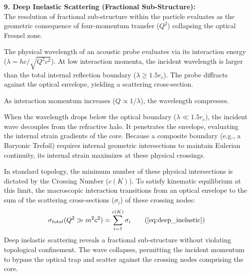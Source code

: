 \textbf{9. Deep Inelastic Scattering (Fractional Sub-Structure):} \\
The resolution of fractional sub-structure within the particle evaluates as the geometric consequence of four-momentum transfer ($Q^2$) collapsing the optical Fresnel zone.

The physical wavelength of an acoustic probe evaluates via its interaction energy ($\lambda = hc / \sqrt{Q^2 c^2}$). At low interaction momenta, the incident wavelength is larger than the total internal reflection boundary ($\lambda \ge 1.5 r_c$). The probe diffracts against the optical envelope, yielding a scattering cross-section.

As interaction momentum increases ($Q \propto 1/\lambda$), the wavelength compresses.  

When the wavelength drops below the optical boundary ($\lambda \ll 1.5 r_c$), the incident wave decouples from the refractive halo. It penetrates the envelope, evaluating the internal strain gradients of the core. Because a composite boundary (e.g., a Baryonic Trefoil) requires internal geometric intersections to maintain Eulerian continuity, its internal strain maximizes at these physical crossings.

In standard topology, the minimum number of these physical intersections is dictated by the Crossing Number ($c(K)$). To satisfy kinematic equilibrium at this limit, the macroscopic interaction transitions from an optical envelope to the sum of the scattering cross-sections ($\sigma_i$) of these crossing nodes:
\begin{equation}
    \sigma_{total}(Q^2 \gg m^2 c^2) = \sum_{i=1}^{c(K)} \sigma_{i} \tag{\ref{eq:deep_inelastic}} 
\end{equation}
Deep inelastic scattering reveals a fractional sub-structure without violating topological confinement. The wave collapses, permitting the incident momentum to bypass the optical trap and scatter against the crossing nodes comprising the core.

